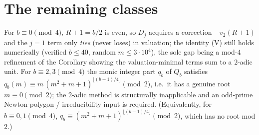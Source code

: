 \documentclass[11pt]{article}
\newcommand{\vv}{v_2}
\begin{document}
\section{The remaining classes}
For $b\equiv0\pmod4$, $R+1=b/2$ is even, so $D_j$ acquires a correction $-\vv(R+1)$ and the
$j=1$ term only \emph{ties} (never loses) in valuation; the identity (V) still holds
numerically (verified $b\le40$, random $m\le3\cdot10^4$), the sole gap being a mod-$4$
refinement of the Corollary showing the valuation-minimal terms sum to a $2$-adic unit. For
$b\equiv2,3\pmod4$ the monic integer part $q_b$ of $Q_b$ satisfies
$q_b(m)\equiv m\,(m^2+m+1)^{\lfloor(b-1)/4\rfloor}\pmod 2$, i.e.\ it has a genuine root
$m\equiv0\pmod2$; the $2$-adic method is structurally inapplicable and an odd-prime
Newton-polygon / irreducibility input is required. (Equivalently, for $b\equiv0,1\pmod4$,
$q_b\equiv(m^2+m+1)^{\lfloor(b-1)/4\rfloor}\pmod2$, which has no root mod $2$.)
\end{document}

